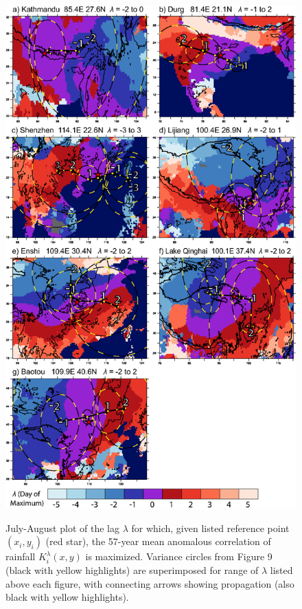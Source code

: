 \begin{figure}[t]
  \centering
  \noindent\includegraphics[width=28pc,angle=0]{Figures/ch2/fig9kmax}\\
  \caption{July-August plot of the lag $\lambda$ for which, given listed reference point $(x_i,y_i)$ (red star), the 57-year mean anomalous correlation of rainfall $K_i^\lambda(x,y)$ is maximized. Variance circles from Figure 9 (black with yellow highlights) are superimposed for range of $\lambda$ listed above each figure, with connecting arrows showing propagation (also black with yellow highlights).}
  \label{fig:f29}
\end{figure}

